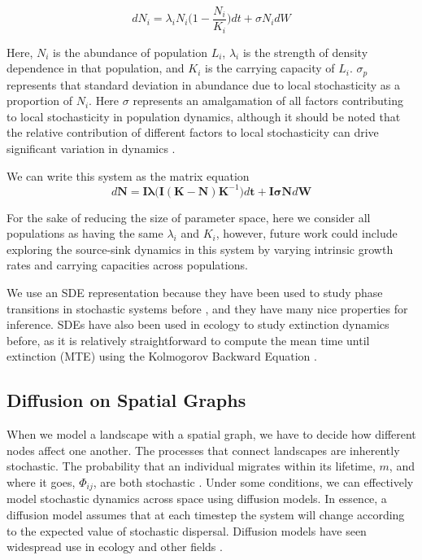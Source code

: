 \documentclass[]{article}
\begin{document}
\[dN_i=\lambda_i N_i \bigg(1 - \frac{N_i}{K_i}\bigg)dt+\sigma N_idW\]

Here, \(N_i\) is the abundance of population \(L_i\), \(\lambda_i\) is the
strength of density dependence in that population, and \(K_i\) is the
carrying capacity of \(L_i\). \(\sigma_p\) represents that standard
deviation in abundance due to local stochasticity as a proportion of
\(N_i\). Here \(\sigma\) represents an amalgamation of all factors
contributing to local stochasticity in population dynamics, although it
should be noted that the relative contribution of different factors to
local stochasticity can drive significant variation in dynamics
\cite{melbourne_extinction_2008}.


We can write this system as the matrix equation
\begin{equation}
        d\boldsymbol{N} = \boldsymbol{I} \boldsymbol{\lambda} \bigg(\boldsymbol{I}(\boldsymbol{K} - \boldsymbol{N})\boldsymbol{K}^{-1} \bigg) d\boldsymbol{t} + \boldsymbol{I} \boldsymbol{\sigma} \boldsymbol{N} d\boldsymbol{W}
\end{equation}


For the sake of reducing the size of parameter
space, here we consider all populations as having the same \(\lambda_i\)
and \(K_i\), however, future work could include exploring the
source-sink dynamics in this system by varying intrinsic growth rates
and carrying capacities across populations.

We use an SDE representation because they have been used to study phase
transitions in stochastic systems before \cite{brock_early_2012, kuehn_mathematical_2011}, and they have many nice properties for inference. SDEs
have also been used in ecology to study extinction dynamics before, as it is relatively straightforward to compute the mean time until extinction (MTE) using
the Kolmogorov Backward Equation \cite{lande_stochastic_2003}.

\hypertarget{diffusion-on-spatial-graphs}{%
\subsection{Diffusion on Spatial
Graphs}\label{diffusion-on-spatial-graphs}}

When we model a landscape with a spatial graph, we have to decide how
different nodes affect one another. The processes that connect
landscapes are inherently stochastic. The probability that an individual
migrates within its lifetime, $m$, and where it goes, $\Phi_{ij}$, are both stochastic . Under some conditions, we can
effectively model stochastic dynamics across space using diffusion
models. In essence, a diffusion model assumes that at each timestep the
system will change according to the expected value of stochastic
dispersal. Diffusion models have seen widespread use in ecology and
other fields \cite{ovaskainen_empirical_2008, holmes_partial-differential_1994, okubo_diffusion_2011}.
\end{document}

